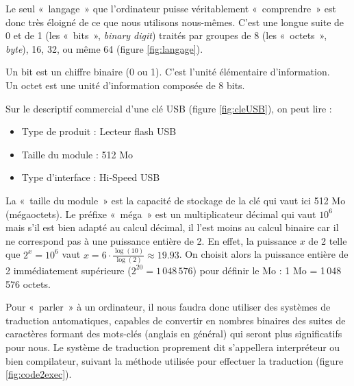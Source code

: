 Le seul «~langage~» 
que l'ordinateur puisse véritablement «~comprendre~» 
est donc très éloigné de ce que nous utilisons nous-mêmes. 
C'est une 
longue suite de 0 et de 1 (les «~bits~», {\em binary digit}) traités par
groupes de 8 (les «~octets~», {\em byte}), 16, 32, ou même 64
(figure \ref{fig:langage}). 

\begin{defin}
Un bit est un chiffre binaire (0 ou 1). 
C'est l'unité élémentaire d'information.\\
Un octet est une unité d'information composée de 8 bits.
\end{defin}

\begin{ex}\label{ex:megaoctet}
Sur le descriptif commercial d'une clé USB (figure \ref{fig:cleUSB}), on peut lire :
\begin{itemize}
\item Type de produit  : Lecteur flash USB
\item Taille du module : 512 Mo
\item Type d'interface : Hi-Speed USB
\end{itemize}
\end{ex}
\noindent La «~taille du module~» est la capacité de stockage de la clé qui vaut ici 512 Mo (mégaoctets).
Le préfixe «~méga~» est un multiplicateur décimal qui vaut $10^6$ mais s'il est bien adapté au calcul décimal,
il l'est moins au calcul binaire car il ne correspond pas à une puissance entière de 2. 
En effet, la puissance $x$ de 2 telle que $2^x = 10^6$
vaut $\displaystyle x = 6\cdot\frac{\log(10)}{\log(2)} \approx 19.93$. On choisit alors la puissance entière de 2
immédiatement supérieure ($2^{20} = 1\,048\,576$) pour définir le Mo : 
1 Mo = 1\,048\,576 octets.

Pour «~parler~» à un ordinateur, il nous faudra donc utiliser des
systèmes de traduction automatiques, capables de convertir en nombres binaires des suites de
caractères formant des mots-clés (anglais en général) qui seront plus significatifs pour nous.
Le système de traduction proprement dit s'appellera interpréteur ou bien compilateur, suivant la
méthode utilisée pour effectuer la traduction (figure \ref{fig:code2exec}). 

